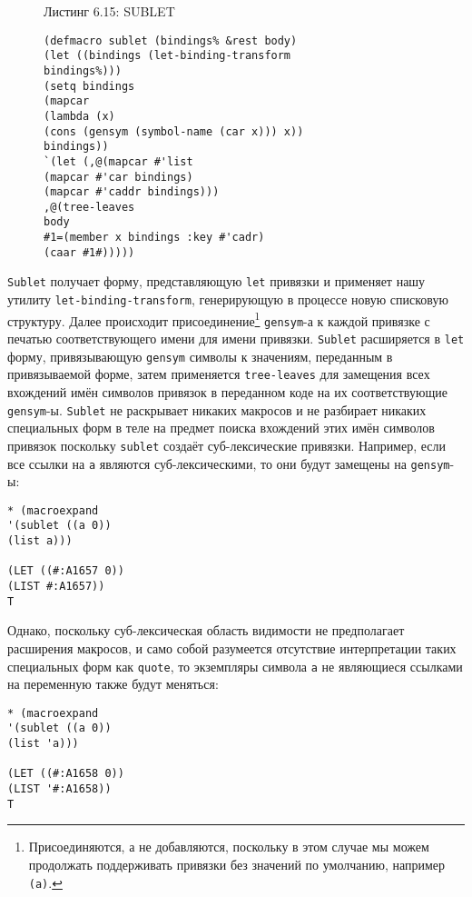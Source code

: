 \begin{figure}Листинг 6.15: SUBLET\label{listing_6.15}
\listbegin
\begin{verbatim}
(defmacro sublet (bindings% &rest body)
(let ((bindings (let-binding-transform
bindings%)))
(setq bindings
(mapcar
(lambda (x)
(cons (gensym (symbol-name (car x))) x))
bindings))
`(let (,@(mapcar #'list
(mapcar #'car bindings)
(mapcar #'caddr bindings)))
,@(tree-leaves
body
#1=(member x bindings :key #'cadr)
(caar #1#)))))
\end{verbatim}
\listend
\end{figure}

\verb"Sublet" получает форму, представляющую \verb"let" привязки и применяет нашу утилиту \verb"let-binding-transform", генерирующую в процессе новую списковую структуру. Далее происходит присоединение\footnote{Присоединяются, а не добавляются, поскольку в этом случае мы можем продолжать поддерживать привязки без значений по умолчанию, например \verb"(a)".} \verb"gensym"-а к каждой привязке с печатью соответствующего имени для имени привязки. \verb"Sublet" расширяется в \verb"let" форму, привязывающую \verb"gensym" символы к значениям, переданным в привязываемой форме, затем применяется \verb"tree-leaves" для замещения всех вхождений имён символов привязок в переданном коде на их соответствующие \verb"gensym"-ы. \verb"Sublet" не раскрывает никаких макросов и не разбирает никаких специальных форм в теле на предмет поиска вхождений этих имён символов привязок поскольку \verb"sublet" создаёт суб-лексические привязки. Например, если все ссылки на \verb"a" являются суб-лексическими, то они будут замещены на \verb"gensym"-ы:



\begin{verbatim}
* (macroexpand
'(sublet ((a 0))
(list a)))

(LET ((#:A1657 0))
(LIST #:A1657))
T
\end{verbatim}

Однако, поскольку суб-лексическая область видимости не предполагает расширения макросов, и само собой разумеется отсутствие интерпретации таких специальных форм как \verb"quote", то экземпляры символа \verb"a" не являющиеся ссылками на переменную также будут меняться:

\begin{verbatim}
* (macroexpand
'(sublet ((a 0))
(list 'a)))

(LET ((#:A1658 0))
(LIST '#:A1658))
T
\end{verbatim}

